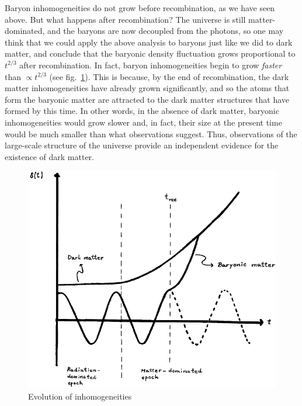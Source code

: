Baryon inhomogeneities do not grow before recombination, as we have seen above. But what happens after recombination? The universe is still matter-dominated, and the baryons are now decoupled from the photons, so one may think that we could apply the above analysis to baryons just like we did to dark matter, and conclude that the baryonic density fluctuation grows proportional to $t^{2/3}$ after recombination. In fact, baryon inhomogeneities begin to grow {\it faster} than $\propto t^{2/3}$ (see fig.\ \ref{fig:lec8_5}). This is because, by the end of recombination, the dark matter inhomogeneities have already grown significantly, and so the atoms that form the baryonic matter are attracted to the dark matter structures that have formed by this time. In other words, in the absence of dark matter, baryonic inhomogeneities would grow slower and, in fact, their size at the present time would be much smaller than what observations suggest. Thus, observations of the large-scale structure of the universe provide an 
independent evidence for the existence of dark matter.
\begin{figure}[ht]
\begin{center}
\includegraphics[scale=0.5]{Draw/lec8_5.png}
\end{center}
\caption{Evolution of inhomogeneities}
\label{fig:lec8_5}
\end{figure}

